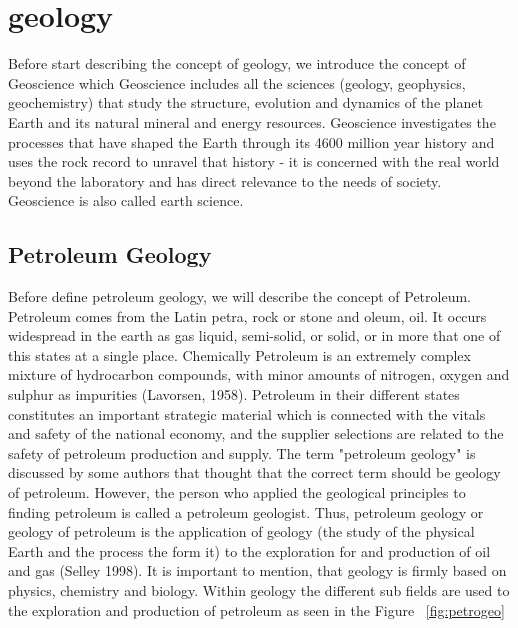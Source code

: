 \chapter{geology}
Before start describing the concept of geology, we introduce the concept of Geoscience which 
Geoscience includes all the sciences (geology, geophysics, geochemistry) that study the structure, evolution and dynamics of the planet Earth and its natural mineral and energy resources. Geoscience investigates the processes that have shaped the Earth through its 4600 million year history and uses the rock record to unravel that history - it is concerned with the real world beyond the laboratory and has direct relevance to the needs of society. Geoscience is also called earth science. 

\section{Petroleum Geology}
Before define petroleum geology, we will describe the concept of Petroleum. Petroleum comes from the Latin petra, rock or stone and oleum, oil. It occurs widespread in the earth as gas liquid, semi-solid, or solid, or in more that one of this states at a single place. Chemically Petroleum is an extremely complex mixture of hydrocarbon compounds, with minor amounts of nitrogen, oxygen and sulphur as impurities (Lavorsen, 1958). Petroleum in their different states  constitutes an important strategic material which is connected with the vitals and safety of the national economy, and the supplier selections are related to the safety of petroleum production and supply.
The term "petroleum geology" is discussed by some authors that thought that the correct term should be geology of petroleum. However, the person who applied the geological principles to finding petroleum is called a petroleum geologist. Thus, petroleum geology or geology of petroleum is the application of  geology (the study of the physical Earth and the process the form it) to the exploration for and production of oil and gas (Selley 1998).  It is important to mention, that geology is firmly based on physics, chemistry and biology.  Within geology the different sub fields are used to the exploration and production of petroleum as seen in the Figure ~\ref{fig:petrogeo}


